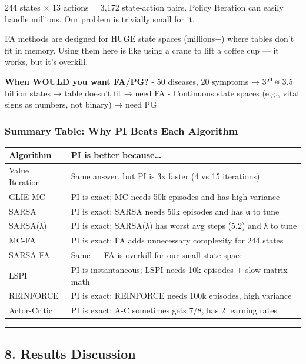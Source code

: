 \documentclass[
]{article}
\begin{document}
244 states × 13 actions = 3,172 state-action pairs. Policy Iteration can
easily handle millions. Our problem is trivially small for it.

FA methods are designed for HUGE state spaces (millions+) where tables
don't fit in memory. Using them here is like using a crane to lift a
coffee cup --- it works, but it's overkill.

\textbf{When WOULD you want FA/PG?} - 50 diseases, 20 symptoms → 3²⁰ ≈
3.5 billion states → table doesn't fit → need FA - Continuous state
spaces (e.g., vital signs as numbers, not binary) → need PG

\hypertarget{summary-table-why-pi-beats-each-algorithm}{%
\subsubsection{Summary Table: Why PI Beats Each
Algorithm}\label{summary-table-why-pi-beats-each-algorithm}}

\begin{longtable}[]{@{}ll@{}}
\toprule
Algorithm & PI is better because\ldots{} \\
\midrule
\endhead
Value Iteration & Same answer, but PI is 3x faster (4 vs 15
iterations) \\
GLIE MC & PI is exact; MC needs 50k episodes and has high variance \\
SARSA & PI is exact; SARSA needs 50k episodes and has α to tune \\
SARSA(λ) & PI is exact; SARSA(λ) has worst avg steps (5.2) and λ to
tune \\
MC-FA & PI is exact; FA adds unnecessary complexity for 244 states \\
SARSA-FA & Same --- FA is overkill for our small state space \\
LSPI & PI is instantaneous; LSPI needs 10k episodes + slow matrix
math \\
REINFORCE & PI is exact; REINFORCE needs 100k episodes, high variance \\
Actor-Critic & PI is exact; A-C sometimes gets 7/8, has 2 learning
rates \\
\bottomrule
\end{longtable}

\begin{center}\rule{0.5\linewidth}{0.5pt}\end{center}

\hypertarget{results-discussion}{%
\subsection{8. Results Discussion}\label{results-discussion}}
\end{document}
